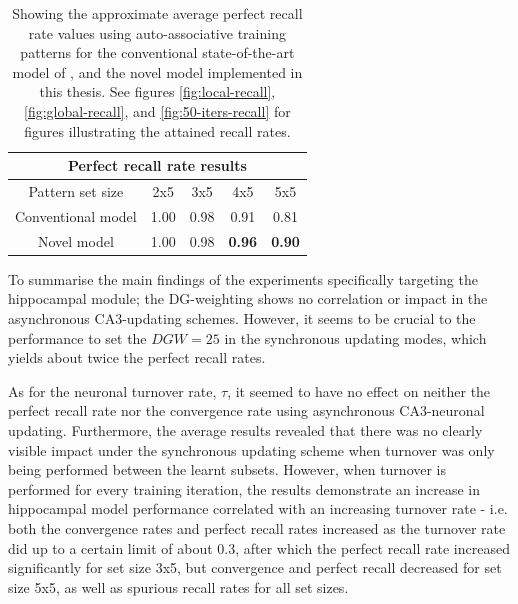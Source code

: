\begin{table}[]
\centering
\caption{Showing the approximate average perfect recall rate values using auto-associative training patterns for the conventional state-of-the-art model of \citep{Hattori2014}, and the novel model implemented in this thesis. See figures \ref{fig:local-recall}, \ref{fig:global-recall}, and \ref{fig:50-iters-recall} for figures illustrating the attained recall rates.}
\label{table:comparison-perfect-recall-rates}
\begin{tabular}{|c|c|c|c|c|}
\hline
\multicolumn{5}{|c|}{Perfect recall rate results}                                         \\ \hline
Pattern set size   & 2x5           & 3x5           & 4x5           & 5x5           \\ \hline
Conventional model & 1.00 & 0.98 & 0.91 & 0.81 \\ \hline
Novel model        & 1.00 & 0.98 & \textbf{0.96} & \textbf{0.90}  \\ \hline
\end{tabular}
\end{table}

To summarise the main findings of the experiments specifically targeting the hippocampal module; the DG-weighting shows no correlation or impact in the asynchronous CA3-updating schemes. However, it seems to be crucial to the performance to set the $DGW=25$ in the synchronous updating modes, which yields about twice the perfect recall rates.

As for the neuronal turnover rate, $\tau$, it seemed to have no effect on neither the perfect recall rate nor the convergence rate using asynchronous CA3-neuronal updating. Furthermore, the average results revealed that there was no clearly visible impact under the synchronous updating scheme when turnover was only being performed between the learnt subsets. However, when turnover is performed for every training iteration, the results demonstrate an increase in hippocampal model performance correlated with an increasing turnover rate - i.e. both the convergence rates and perfect recall rates increased as the turnover rate did up to a certain limit of about 0.3, after which the perfect recall rate increased significantly for set size 3x5, but convergence and perfect recall decreased for set size 5x5, as well as spurious recall rates for all set sizes.


